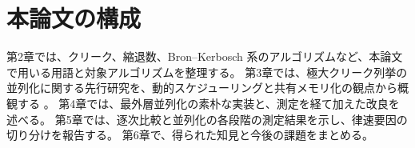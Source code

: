 \section{本論文の構成}
\label{sec:intro-outline}

第2章では、クリーク、縮退数、Bron--Kerbosch 系のアルゴリズムなど、本論文で用いる用語と対象アルゴリズムを整理する。
第3章では、極大クリーク列挙の並列化に関する先行研究を、動的スケジューリングと共有メモリ化の観点から概観する \cite{schmidt2009,das2018parmce}。
第4章では、最外層並列化の素朴な実装と、測定を経て加えた改良を述べる。
第5章では、逐次比較と並列化の各段階の測定結果を示し、律速要因の切り分けを報告する。
第6章で、得られた知見と今後の課題をまとめる。
